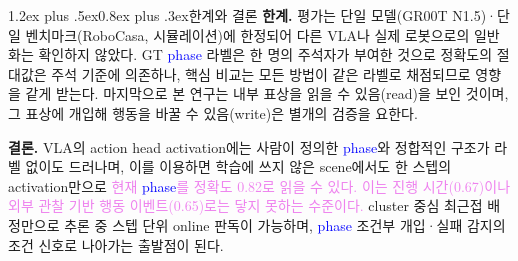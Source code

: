 \documentclass[a4paper,twocolumn,9pt]{extarticle}
\makeatletter
\newcommand{\term}[1]{\textcolor{blue}{#1}}  %
\newcommand{\rev}[1]{\textcolor{violet}{#1}}  %
\renewcommand\section{\@startsection{section}{1}{\z@}%
  {1.2ex plus .5ex}{0.8ex plus .3ex}{\normalsize\bfseries}}
\makeatother
\begin{document}


\section{한계와 결론}
\textbf{한계.} 평가는 단일 모델(GR00T N1.5)·단일 벤치마크(RoboCasa, 시뮬레이션)에 한정되어 다른 VLA나 실제 로봇으로의 일반화는 확인하지 않았다. GT \term{phase} 라벨은 한 명의 주석자가 부여한 것으로 정확도의 절대값은 주석 기준에 의존하나, 핵심 비교는 모든 방법이 같은 라벨로 채점되므로 영향을 같게 받는다. 마지막으로 본 연구는 내부 표상을 읽을 수 있음(read)을 보인 것이며, 그 표상에 개입해 행동을 바꿀 수 있음(write)은 별개의 검증을 요한다.

\textbf{결론.} VLA의 action head activation에는 사람이 정의한 \term{phase}와 정합적인 구조가 라벨 없이도 드러나며, 이를 이용하면 학습에 쓰지 않은 scene에서도 한 스텝의 activation만으로 \rev{현재 \term{phase}를 정확도 0.82로 읽을 수 있다. 이는 진행 시간(0.67)이나 외부 관찰 기반 행동 이벤트(0.65)로는 닿지 못하는 수준이다.} cluster 중심 최근접 배정만으로 추론 중 스텝 단위 online 판독이 가능하며, \term{phase} 조건부 개입·실패 감지의 조건 신호로 나아가는 출발점이 된다.

\end{document}
